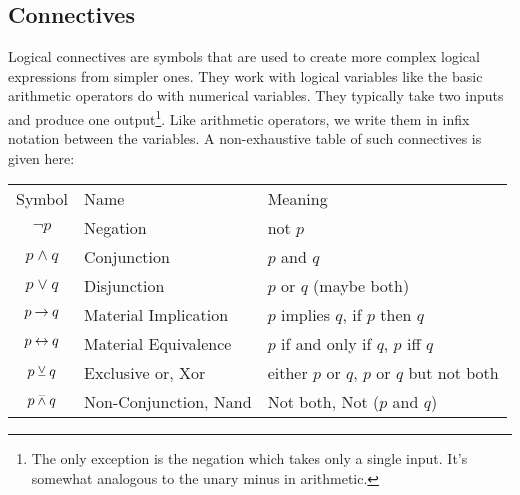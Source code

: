 


\subsection{Connectives}
Logical connectives are symbols that are used to create more complex logical expressions from simpler ones. They work with logical variables like the basic arithmetic operators do with numerical variables. They typically take two inputs and produce one output\footnote{The only exception is the negation which takes only a single input. It's somewhat analogous to the unary minus in arithmetic.}. Like arithmetic operators, we write them in infix notation between the variables. A non-exhaustive table of such connectives is given here:

\medskip
\begin{tabular}{c l l}
\label{Tab:LogicConnectives}
  Symbol           & Name                  & Meaning      \\
  $\neg p$         & Negation              & not $p$       \\
  $p \wedge q$     & Conjunction           & $p$ and $q$    \\
  $p \vee q$       & Disjunction           & $p$ or $q$ (maybe both)   \\
  $p \mathbin{\rightarrow} q$      & Material Implication  & $p$ implies $q$, if $p$ then $q$   \\  
  $p \mathbin{\leftrightarrow} q$    & Material Equivalence  & $p$ if and only if $q$, $p$ iff $q$   \\    
  $p \mathbin{\veebar} q$       & Exclusive or, Xor     & either $p$ or $q$, $p$ or $q$ but not both   \\ 
  $p \mathbin{\barwedge} q$      & Non-Conjunction, Nand & Not both, Not ($p$ and $q$)   \\   
\end{tabular}
\medskip

